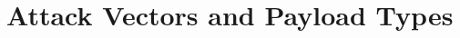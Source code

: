 \section{Attack Vectors and Payload Types}
\label{section:AttackVectorsPayloadTypes}
\AttackVectors



